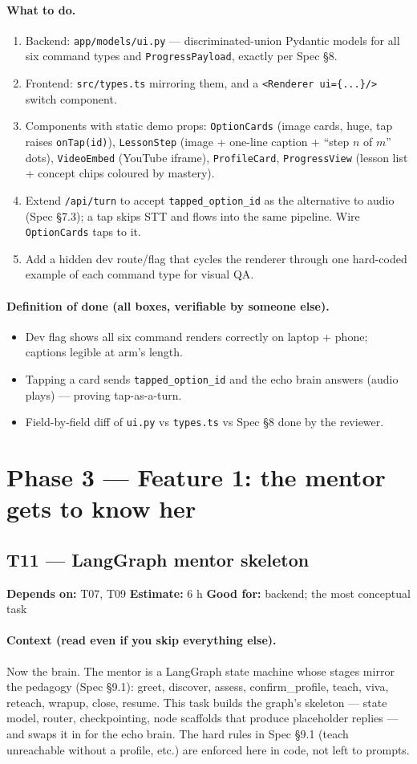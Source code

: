 \documentclass[11pt]{article}
\newcommand{\code}[1]{\texttt{#1}}
\newcommand{\taskmeta}[3]{\noindent\textbf{Depends on:} #1 \quad\textbullet\quad \textbf{Estimate:} #2 \quad\textbullet\quad \textbf{Good for:} #3\par\vspace{2pt}}
\newcommand{\ctx}[1]{\paragraph{Context (read even if you skip everything else).} #1}
\newcommand{\dod}{\paragraph{Definition of done (all boxes, verifiable by someone else).}}
\begin{document}
\paragraph{What to do.}
\begin{enumerate}
  \item Backend: \code{app/models/ui.py} --- discriminated-union Pydantic models for all six command types and \code{ProgressPayload}, exactly per Spec \S8.
  \item Frontend: \code{src/types.ts} mirroring them, and a \code{<Renderer ui=\{...\}/>} switch component.
  \item Components with static demo props: \code{OptionCards} (image cards, huge, tap raises \code{onTap(id)}), \code{LessonStep} (image + one-line caption + ``step $n$ of $m$'' dots), \code{VideoEmbed} (YouTube iframe), \code{ProfileCard}, \code{ProgressView} (lesson list + concept chips coloured by mastery).
  \item Extend \code{/api/turn} to accept \code{tapped\_option\_id} as the alternative to audio (Spec \S7.3); a tap skips STT and flows into the same pipeline. Wire \code{OptionCards} taps to it.
  \item Add a hidden dev route/flag that cycles the renderer through one hard-coded example of each command type for visual QA.
\end{enumerate}
\dod
\begin{itemize}
  \item Dev flag shows all six command renders correctly on laptop + phone; captions legible at arm's length.
  \item Tapping a card sends \code{tapped\_option\_id} and the echo brain answers (audio plays) --- proving tap-as-a-turn.
  \item Field-by-field diff of \code{ui.py} vs \code{types.ts} vs Spec \S8 done by the reviewer.
\end{itemize}

\section{Phase 3 --- Feature 1: the mentor gets to know her}

\subsection{T11 --- LangGraph mentor skeleton}
\taskmeta{T07, T09}{6 h}{backend; the most conceptual task}
\ctx{Now the brain. The mentor is a LangGraph state machine whose stages mirror the pedagogy (Spec \S9.1): greet, discover, assess, confirm\_profile, teach, viva, reteach, wrapup, close, resume. This task builds the graph's skeleton --- state model, router, checkpointing, node scaffolds that produce placeholder replies --- and swaps it in for the echo brain. The hard rules in Spec \S9.1 (teach unreachable without a profile, etc.) are enforced here in code, not left to prompts.}
\end{document}
